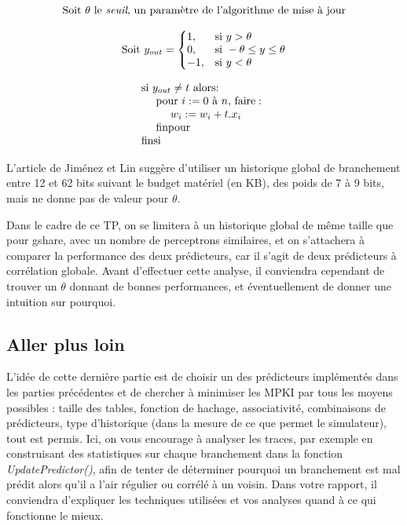 \documentclass[a4paper]{article}
\begin{document}
\vspace*{-20px}

\begin{equation*}
\text{Soit~} \theta \text{~le \textit{seuil}, un paramètre de l'algorithme de mise à jour}
\end{equation*}

\vspace*{-20px}

\begin{equation*}
\text{Soit~} y_{out}=\left\{
\begin{array}{@{}ll@{}}
1, & \text{si~} y > \theta \\
0, & \text{si~} -\theta \leq y \leq \theta \\
-1, & \text{si~} y < \theta
\end{array}\right.
\end{equation*} 

\begin{equation*}
\begin{array}{@{}ll@{}}
\text{si~}y_{out} \neq t \text{~alors:} \\
  \text{~~~~pour $i := 0$ à $n$, faire}: \\
    \text{~~~~~~~~} w_i := w_i + t.x_i \\
  \text{~~~~finpour} \\
\text{finsi}
\end{array}
\end{equation*}

L'article de Jiménez et Lin suggère d'utiliser un historique global de branchement entre 12 et 62 bits suivant le budget matériel (en KB), des poids de 7 à 9 bits, mais ne donne pas de valeur pour $\theta$.

Dans le cadre de ce TP, on se limitera à un historique global de même taille que pour gshare, avec un nombre de perceptrons similaires, et on s'attachera à comparer la performance des deux prédicteurs, car il s'agit de deux prédicteurs à corrélation globale. Avant d'effectuer cette analyse, il conviendra cependant de trouver un $\theta$ donnant de bonnes performances, et éventuellement de donner une intuition sur pourquoi. 



\subsection{Aller plus loin}

L'idée de cette dernière partie est de choisir un des prédicteurs implémentés dans les parties précédentes et de chercher à minimiser les MPKI par tous les moyens possibles : taille des tables, fonction de hachage, associativité, combinaisons de prédicteurs, type d'historique (dans la mesure de ce que permet le simulateur), tout est permis. Ici, on vous encourage à analyser les traces, par exemple en construisant des statistiques sur chaque branchement dans la fonction \textit{UpdatePredictor()}, afin de tenter de déterminer pourquoi un branchement est mal prédit alors qu'il a l'air régulier ou corrélé à un voisin. Dans votre rapport, il conviendra d'expliquer les techniques utilisées et vos analyses quand à ce qui fonctionne le mieux.
\end{document}
